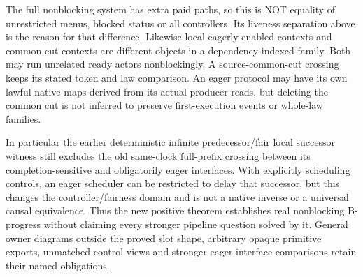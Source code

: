 \documentclass[11pt]{article}\usepackage{amsmath,amssymb,amsthm}
\begin{document}
The full nonblocking system has extra paid paths, so this is NOT equality of unrestricted menus, blocked status or all controllers. Its liveness separation above is the reason for that difference. Likewise local eagerly enabled contexts and common-cut contexts are different objects in a dependency-indexed family. Both may run unrelated ready actors nonblockingly. A source-common-cut crossing keeps its stated token and law comparison. An eager protocol may have its own lawful native maps derived from its actual producer reads, but deleting the common cut is not inferred to preserve first-execution events or whole-law families.

In particular the earlier deterministic infinite predecessor/fair local successor witness still excludes the old same-clock full-prefix crossing between its completion-sensitive and obligatorily eager interfaces. With explicitly scheduling controls, an eager scheduler can be restricted to delay that successor, but this changes the controller/fairness domain and is not a native inverse or a universal causal equivalence. Thus the new positive theorem establishes real nonblocking B-progress without claiming every stronger pipeline question solved by it. General owner diagrams outside the proved slot shape, arbitrary opaque primitive exports, unmatched control views and stronger eager-interface comparisons retain their named obligations.
\end{document}
